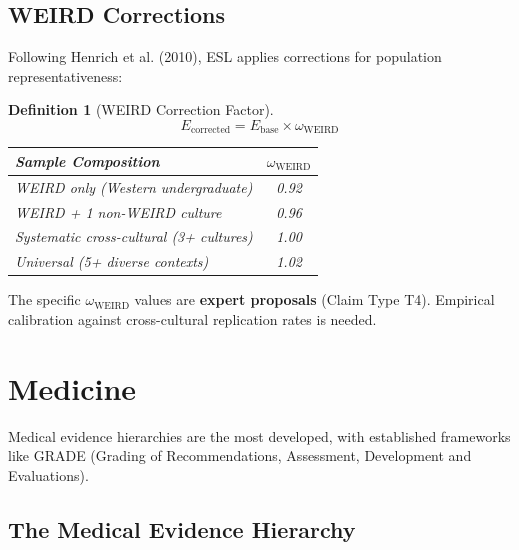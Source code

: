 \documentclass[11pt,a4paper]{article}
\newtheorem{definition}{Definition}[section]
\theoremstyle{remark}
\begin{document}
\subsection{WEIRD Corrections}

Following Henrich et al. (2010), ESL applies corrections for population representativeness:

\begin{definition}[WEIRD Correction Factor]
\label{def:weird}
\begin{equation}
E_{\text{corrected}} = E_{\text{base}} \times \omega_{\text{WEIRD}}
\end{equation}

\begin{center}
\begin{tabular}{lc}
\toprule
\textbf{Sample Composition} & $\omega_{\text{WEIRD}}$ \\
\midrule
WEIRD only (Western undergraduate) & 0.92 \\
WEIRD + 1 non-WEIRD culture & 0.96 \\
Systematic cross-cultural (3+ cultures) & 1.00 \\
Universal (5+ diverse contexts) & 1.02 \\
\bottomrule
\end{tabular}
\end{center}
\end{definition}

\begin{warningbox}[title={Validation Status}]
The specific $\omega_{\text{WEIRD}}$ values are \textbf{expert proposals} (Claim Type T4). Empirical calibration against cross-cultural replication rates is needed.
\end{warningbox}


\section{Medicine}
\label{sec:medicine}

Medical evidence hierarchies are the most developed, with established frameworks like GRADE (Grading of Recommendations, Assessment, Development and Evaluations).

\subsection{The Medical Evidence Hierarchy}
\end{document}
